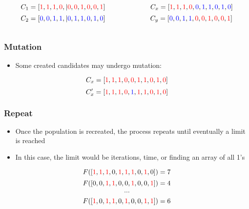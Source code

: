\documentclass{beamer}
\begin{document}
\begin{frame}
\begin{frame}
\begin{columns}
\begin{column}{0.5\textwidth}
\[
C_1=[ \textcolor{red}{1},  \textcolor{red}{1}, \textcolor{red}{1},  \textcolor{red}{0},|  \textcolor{red}{0},  \textcolor{red}{0}, \textcolor{red}{1}, \textcolor{red}{0}, \textcolor{red}{0}, \textcolor{red}{1} ]
\]
\[C_2=[  \textcolor{blue}{0}, \textcolor{blue}{0}, \textcolor{blue}{1}, \textcolor{blue}{1},| \textcolor{blue}{0}, \textcolor{blue}{1}, \textcolor{blue}{1}, \textcolor{blue}{0}, \textcolor{blue}{1}, \textcolor{blue}{0} ]
\]
\end{column}
 \begin{column}{0.5\textwidth}

   \[
C_x=[ \textcolor{red}{1},  \textcolor{red}{1}, \textcolor{red}{1},  \textcolor{red}{0}, \textcolor{blue}{0}, \textcolor{blue}{1}, \textcolor{blue}{1}, \textcolor{blue}{0}, \textcolor{blue}{1}, \textcolor{blue}{0} ]
\]
\[C_y = [  \textcolor{blue}{0}, \textcolor{blue}{0}, \textcolor{blue}{1}, \textcolor{blue}{1}, \textcolor{red}{0},  \textcolor{red}{0}, \textcolor{red}{1}, \textcolor{red}{0}, \textcolor{red}{0}, \textcolor{red}{1} ]
\]
  \end{column}
  \end{columns}
\end{frame}

\begin{frame}
  \frametitle{Mutation}
\begin{itemize}
  \item Some created candidates may undergo mutation:
\end{itemize}
\[
C_x=[ \textcolor{red}{1},  \textcolor{red}{1}, \textcolor{red}{1},  \textcolor{red}{0}, \textcolor{red}{0}, \textcolor{red}{1}, \textcolor{red}{1}, \textcolor{red}{0}, \textcolor{red}{1}, \textcolor{red}{0} ]
\]
\[C_x'=[ \textcolor{red}{1},  \textcolor{red}{1}, \textcolor{red}{1},  \textcolor{red}{0}, \textcolor{blue}{1}, \textcolor{red}{1}, \textcolor{red}{1}, \textcolor{red}{0}, \textcolor{red}{1}, \textcolor{red}{0} ]
\]
\end{frame}

\begin{frame}
  \frametitle{Repeat}
\begin{itemize}
  \item Once the population is recreated, the process repeats until eventually a limit is reached
  \item In this case, the limit would be iterations, time, or finding an array of all 1's
\end{itemize}
\[
F([ \textcolor{red}{1},  \textcolor{red}{1}, \textcolor{red}{1}, 0, \textcolor{red}{1}, \textcolor{red}{1}, \textcolor{red}{1}, 0, \textcolor{red}{1}, 0 ]) = 7
\]
\[F([  0, 0, \textcolor{red}{1}, \textcolor{red}{1}, 0,  0, \textcolor{red}{1}, 0, 0, \textcolor{red}{1} ]) = 4
\]
\[\cdots\]
\[F([  \textcolor{red}{1}, 0, \textcolor{red}{1}, \textcolor{red}{1}, 0,  \textcolor{red}{1}, 0, 0, \textcolor{red}{1}, \textcolor{red}{1} ]) = 6
\]
\end{frame}


\end{frame}
\end{document}
